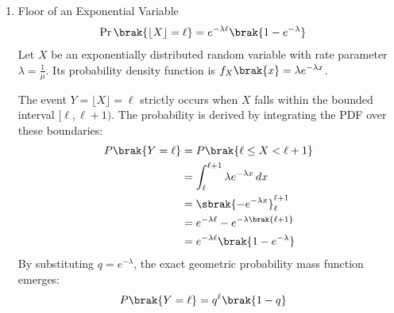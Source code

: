 \begin{enumerate}[label=\thesubsection.\arabic*, ref=\thesubsection.\theenumi]
Standardizing the interval $\sbrak{a, b}$ maps the boundaries to the standard normal variable $Z$. Without the $0.5$ continuity correction factor applied, the interval probability evaluates directly in terms of the standard normal Cumulative Distribution Function (CDF), denoted by $\phi\brak{x} = \frac{1}{\sqrt{2\pi}}\int_{-\infty}^{x} e^{-t^2/2}\,dt$:
\begin{align}
	P\brak{a \le Y \le b} &\approx P\brak{\frac{a - \mu}{\sigma} \le Z \le \frac{b - \mu}{\sigma}} \nonumber
	\\
	&= \phi\brak{\frac{b - n\theta}{\sqrt{n\theta\brak{1-\theta}}}} - \phi\brak{\frac{a - n\theta}{\sqrt{n\theta\brak{1-\theta}}}} \label{eq:DA2025-clt_binomial}
\end{align}
	\item Floor of an Exponential Variable
	\begin{align}
		\Pr\brak{\lfloor X \rfloor = \ell} &= e^{-\lambda \ell}\brak{1 - e^{-\lambda}} \label{eq:DA2025-exp_geom}
	\end{align}
	\solution
	Let $X$ be an exponentially distributed random variable with rate parameter $\lambda = \frac{1}{\mu}$. Its probability density function is $f_X\brak{x} = \lambda e^{-\lambda x}$. 
	
	The event $Y = \lfloor X \rfloor = \ell$ strictly occurs when $X$ falls within the bounded interval $[\ell, \ell+1)$. The probability is derived by integrating the PDF over these boundaries:
	\begin{align}
		P\brak{Y = \ell} &= P\brak{\ell \le X < \ell + 1}
		\\
		&= \int_{\ell}^{\ell+1} \lambda e^{-\lambda x} \,dx
		\\
		&= \sbrak{-e^{-\lambda x}}_{\ell}^{\ell+1}
		\\
		&= e^{-\lambda \ell} - e^{-\lambda\brak{\ell+1}}
		\\
		&= e^{-\lambda \ell} \brak{1 - e^{-\lambda}}
	\end{align}
	By substituting $q = e^{-\lambda}$, the exact geometric probability mass function emerges:
	\begin{align}
		P\brak{Y = \ell} &= q^\ell \brak{1 - q} \label{eq:DA2025-geom_pmf_q}
	\end{align}
	

\end{enumerate}

